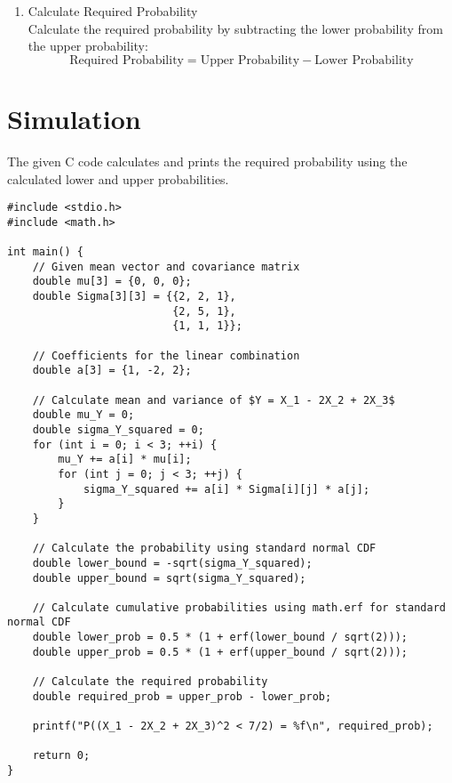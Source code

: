 \documentclass[journal,12pt,twocolumn]{IEEEtran}
\begin{document}
\begin{enumerate}
    \item Calculate Required Probability \\
    Calculate the required probability by subtracting the lower probability from the upper probability:
    \[
    \text{Required Probability} = \text{Upper Probability} - \text{Lower Probability}
    \]
\end{enumerate}

\section{Simulation}

The given C code calculates and prints the required probability using the calculated lower and upper probabilities.

\begin{verbatim}
#include <stdio.h>
#include <math.h>

int main() {
    // Given mean vector and covariance matrix
    double mu[3] = {0, 0, 0};
    double Sigma[3][3] = {{2, 2, 1},
                          {2, 5, 1},
                          {1, 1, 1}};

    // Coefficients for the linear combination
    double a[3] = {1, -2, 2};

    // Calculate mean and variance of $Y = X_1 - 2X_2 + 2X_3$
    double mu_Y = 0;
    double sigma_Y_squared = 0;
    for (int i = 0; i < 3; ++i) {
        mu_Y += a[i] * mu[i];
        for (int j = 0; j < 3; ++j) {
            sigma_Y_squared += a[i] * Sigma[i][j] * a[j];
        }
    }

    // Calculate the probability using standard normal CDF
    double lower_bound = -sqrt(sigma_Y_squared);
    double upper_bound = sqrt(sigma_Y_squared);

    // Calculate cumulative probabilities using math.erf for standard normal CDF
    double lower_prob = 0.5 * (1 + erf(lower_bound / sqrt(2)));
    double upper_prob = 0.5 * (1 + erf(upper_bound / sqrt(2)));

    // Calculate the required probability
    double required_prob = upper_prob - lower_prob;

    printf("P((X_1 - 2X_2 + 2X_3)^2 < 7/2) = %f\n", required_prob);

    return 0;
}
\end{verbatim}
\end{document}
